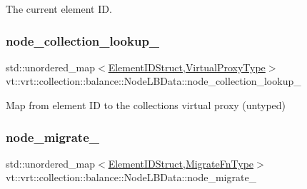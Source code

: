 The current element ID. 

\mbox{\label{structvt_1_1vrt_1_1collection_1_1balance_1_1_node_l_b_data_a87a5425b7dd71812ba4952340cf01946}} 
\subsubsection{\texorpdfstring{node\+\_\+collection\+\_\+lookup\+\_\+}{node\_collection\_lookup\_}}
{\footnotesize\ttfamily std\+::unordered\+\_\+map$<$\hyperlink{namespacevt_1_1vrt_1_1collection_1_1balance_a9f5b53fafb270212279a4757d2c4cd28}{Element\+I\+D\+Struct},\hyperlink{namespacevt_a1b417dd5d684f045bb58a0ede70045ac}{Virtual\+Proxy\+Type}$>$ vt\+::vrt\+::collection\+::balance\+::\+Node\+L\+B\+Data\+::node\+\_\+collection\+\_\+lookup\+\_\+\hspace{0.3cm}{\ttfamily [private]}}



Map from element ID to the collection\textquotesingle{}s virtual proxy (untyped) 

\mbox{\label{structvt_1_1vrt_1_1collection_1_1balance_1_1_node_l_b_data_a4e325cee830c96b4c4129538367fbf37}} 
\subsubsection{\texorpdfstring{node\+\_\+migrate\+\_\+}{node\_migrate\_}}
{\footnotesize\ttfamily std\+::unordered\+\_\+map$<$\hyperlink{namespacevt_1_1vrt_1_1collection_1_1balance_a9f5b53fafb270212279a4757d2c4cd28}{Element\+I\+D\+Struct},\hyperlink{structvt_1_1vrt_1_1collection_1_1balance_1_1_node_l_b_data_a200140e389d08dc8d74db16589e736bc}{Migrate\+Fn\+Type}$>$ vt\+::vrt\+::collection\+::balance\+::\+Node\+L\+B\+Data\+::node\+\_\+migrate\+\_\+\hspace{0.3cm}{\ttfamily [private]}}




